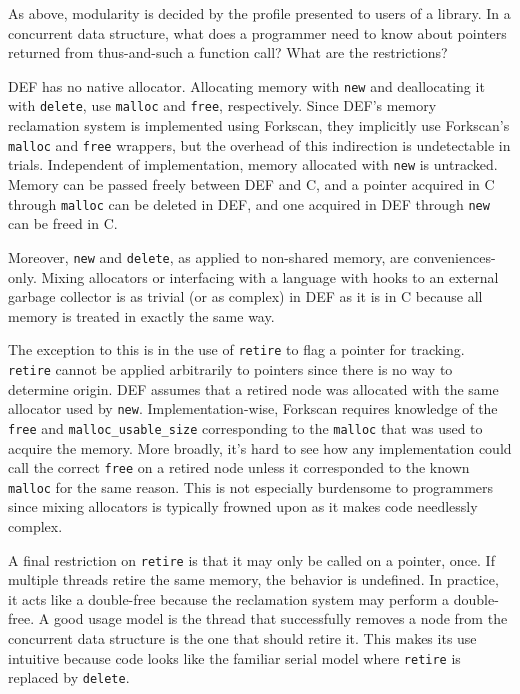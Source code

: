 As above, modularity is decided by the profile presented to users of a library.  In a concurrent data structure, what does a programmer need to know about pointers returned from thus-and-such a function call?  What are the restrictions?

DEF has no native allocator.  Allocating memory with \texttt{new} and deallocating it with \texttt{delete}, use \texttt{malloc} and \texttt{free}, respectively.  Since DEF's memory reclamation system is implemented using Forkscan, they implicitly use Forkscan's \texttt{malloc} and \texttt{free} wrappers, but the overhead of this indirection is undetectable in trials.  Independent of implementation, memory allocated with \texttt{new} is untracked.  Memory can be passed freely between DEF and C, and a pointer acquired in C through \texttt{malloc} can be deleted in DEF, and one acquired in DEF through \texttt{new} can be freed in C.

Moreover, \texttt{new} and \texttt{delete}, as applied to non-shared memory, are conveniences-only.  Mixing allocators or interfacing with a language with hooks to an external garbage collector is as trivial (or as complex) in DEF as it is in C because all memory is treated in exactly the same way.

The exception to this is in the use of \texttt{retire} to flag a pointer for tracking.  \texttt{retire} cannot be applied arbitrarily to pointers since there is no way to determine origin.  DEF assumes that a retired node was allocated with the same allocator used by \texttt{new}.  Implementation-wise, Forkscan requires knowledge of the \texttt{free} and \texttt{malloc\_{}usable\_{}size} corresponding to the \texttt{malloc} that was used to acquire the memory.  More broadly, it's hard to see how any implementation could call the correct \texttt{free} on a retired node unless it corresponded to the known \texttt{malloc} for the same reason.  This is not especially burdensome to programmers since mixing allocators is typically frowned upon as it makes code needlessly complex.

A final restriction on \texttt{retire} is that it may only be called on a pointer, once.  If multiple threads retire the same memory, the behavior is undefined.  In practice, it acts like a double-free because the reclamation system may perform a double-free.  A good usage model is the thread that successfully removes a node from the concurrent data structure is the one that should retire it.  This makes its use intuitive because code looks like the familiar serial model where \texttt{retire} is replaced by \texttt{delete}.

